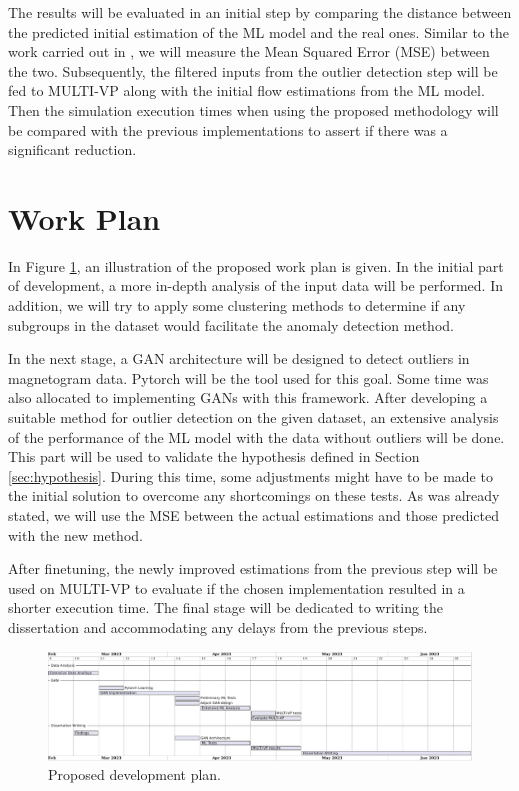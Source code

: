 The results will be evaluated in an initial step by comparing the distance between the predicted initial estimation of the ML model and the real ones. Similar to the work carried out in \cite{barros_InitialConditionEstimation_}, we will measure the Mean Squared Error (MSE) between the two. Subsequently, the filtered inputs from the outlier detection step will be fed to MULTI-VP along with the initial flow estimations from the ML model. Then the simulation execution times when using the proposed methodology will be compared with the previous implementations to assert if there was a significant reduction.

\section{Work Plan}\label{sec:work_plan}
In Figure \ref{fig:work_plan}, an illustration of the proposed work plan is given. In the initial part of development, a more in-depth analysis of the input data will be performed. In addition, we will try to apply some clustering methods to determine if any subgroups in the dataset would facilitate the anomaly detection method.

In the next stage, a GAN architecture will be designed to detect outliers in magnetogram data. Pytorch \cite{NEURIPS2019_9015} will be the tool used for this goal. Some time was also allocated to implementing GANs with this framework. After developing a suitable method for outlier detection on the given dataset, an extensive analysis of the performance of the ML model with the data without outliers will be done. This part will be used to validate the hypothesis defined in Section \ref{sec:hypothesis}. During this time, some adjustments might have to be made to the initial solution to overcome any shortcomings on these tests. As was already stated, we will use the MSE between the actual estimations and those predicted with the new method. 

After finetuning, the newly improved estimations from the previous step will be used on MULTI-VP to evaluate if the chosen implementation resulted in a shorter execution time. The final stage will be dedicated to writing the dissertation and accommodating any delays from the previous steps.

\begin{figure}[ht]
\centering
\includegraphics[width=\textwidth]{figures/work_plan.pdf}
\caption{Proposed development plan.}
\label{fig:work_plan}
\end{figure}
